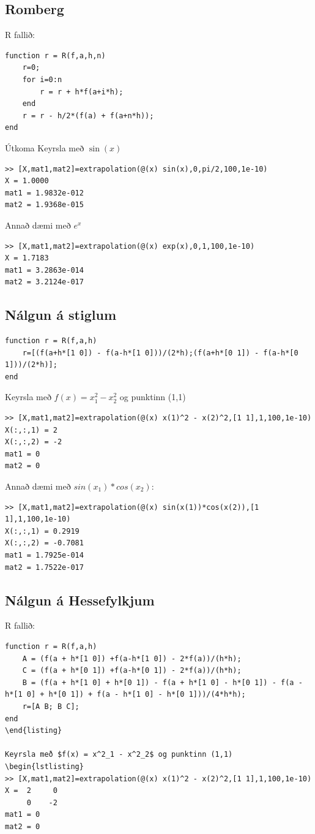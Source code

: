 \documentclass[a4]{article}
\begin{document}
\subsection{Romberg}
R fallið:
\begin{lstlisting}
function r = R(f,a,h,n)
    r=0;
    for i=0:n
        r = r + h*f(a+i*h);
    end
    r = r - h/2*(f(a) + f(a+n*h));
end
\end{lstlisting}
Útkoma
Keyrsla með $\sin(x)$
\begin{lstlisting}
>> [X,mat1,mat2]=extrapolation(@(x) sin(x),0,pi/2,100,1e-10)
X = 1.0000
mat1 = 1.9832e-012
mat2 = 1.9368e-015
\end{lstlisting}  
Annað dæmi með $e^x$
\begin{lstlisting}
>> [X,mat1,mat2]=extrapolation(@(x) exp(x),0,1,100,1e-10)
X = 1.7183
mat1 = 3.2863e-014
mat2 = 3.2124e-017
\end{lstlisting}

\subsection{Nálgun á stiglum}
\begin{lstlisting}
function r = R(f,a,h)
    r=[(f(a+h*[1 0]) - f(a-h*[1 0]))/(2*h);(f(a+h*[0 1]) - f(a-h*[0 1]))/(2*h)];
end
\end{lstlisting}

Keyrsla með $f(x) = x^2_1 - x^2_2$ og punktinn (1,1)
\begin{lstlisting}
>> [X,mat1,mat2]=extrapolation(@(x) x(1)^2 - x(2)^2,[1 1],1,100,1e-10)
X(:,:,1) = 2
X(:,:,2) = -2
mat1 = 0
mat2 = 0
\end{lstlisting}

Annað dæmi með $sin(x_1)*cos(x_2)$:
\begin{lstlisting}
>> [X,mat1,mat2]=extrapolation(@(x) sin(x(1))*cos(x(2)),[1 1],1,100,1e-10)
X(:,:,1) = 0.2919
X(:,:,2) = -0.7081
mat1 = 1.7925e-014
mat2 = 1.7522e-017 
\end{lstlisting}

\subsection{Nálgun á Hessefylkjum}

R fallið:
\begin{lstlisting}
function r = R(f,a,h)
    A = (f(a + h*[1 0]) +f(a-h*[1 0]) - 2*f(a))/(h*h);
    C = (f(a + h*[0 1]) +f(a-h*[0 1]) - 2*f(a))/(h*h);
    B = (f(a + h*[1 0] + h*[0 1]) - f(a + h*[1 0] - h*[0 1]) - f(a - h*[1 0] + h*[0 1]) + f(a - h*[1 0] - h*[0 1]))/(4*h*h);
    r=[A B; B C];
end
\end{listing}

Keyrsla með $f(x) = x^2_1 - x^2_2$ og punktinn (1,1)
\begin{lstlisting}
>> [X,mat1,mat2]=extrapolation(@(x) x(1)^2 - x(2)^2,[1 1],1,100,1e-10)
X =  2     0
     0    -2
mat1 = 0
mat2 = 0
\end{lstlisting}
\end{document}

